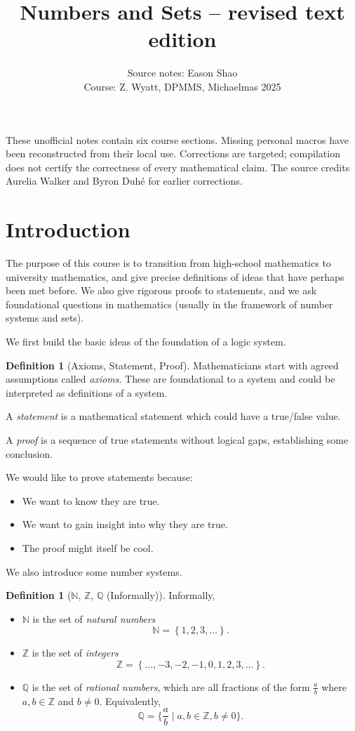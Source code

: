 \documentclass{article}
\title{Numbers and Sets -- revised text edition}
\author{Source notes: Eason Shao\\Course: Z. Wyatt, DPMMS, Michaelmas 2025}
\date{}
\theoremstyle{definition}
\newtheorem{definition}[theorem]{Definition}
\theoremstyle{remark}
\newcommand{\Bqty}[1]{\left\{#1\right\}}
\newcommand{\set}[2]{\{#1\mid #2\}}
\newcommand{\NN}{\mathbb{N}}
\newcommand{\ZZ}{\mathbb{Z}}
\newcommand{\QQ}{\mathbb{Q}}
\begin{document}
\maketitle
These unofficial notes contain six course sections. Missing personal macros have been reconstructed from their local use. Corrections are targeted; compilation does not certify the correctness of every mathematical claim. The source credits Aurelia Walker and Byron Duh\'{e} for earlier corrections.
\tableofcontents
\section{Introduction}
\label{sec:introduction}

The purpose of this course is to transition from high-school mathematics to university mathematics, and give precise definitions of ideas that have perhaps been met before. We also give rigorous proofs to statements, and we ask foundational questions in mathematics (usually in the framework of number systems and sets).


We first build the basic ideas of the foundation of a logic system.

\begin{definition}[Axioms, Statement, Proof]
    Mathematicians start with agreed assumptions called \emph{axioms}. These are foundational to a system and could be interpreted as definitions of a system.

    A \emph{statement} is a mathematical statement which could have a true/false value.

    A \emph{proof} is a sequence of true statements without logical gaps, establishing some conclusion.
\end{definition}

We would like to prove statements because:
\begin{itemize}
    \item We want to know they are true.
    \item We want to gain insight into why they are true.
    \item The proof might itself be cool.
\end{itemize}

We also introduce some number systems.

\begin{definition}[\(\NN\), \(\ZZ\), \(\QQ\) (Informally)]
    Informally,
    \begin{itemize}
        \item \(\NN\) is the set of \emph{natural numbers}
        \[
            \NN = \Bqty{1, 2, 3, \ldots}.
        \]
        \item \(\ZZ\) is the set of \emph{integers}
        \[
            \ZZ = \Bqty{\ldots, -3, -2, -1, 0, 1, 2, 3, \ldots}.
        \]
        \item \(\QQ\) is the set of \emph{rational numbers}, which are all fractions of the form \(\frac{a}{b}\) where \(a, b \in \ZZ\) and \(b \neq 0\). Equivalently,
        \[
            \QQ = \set{\frac{a}{b}}{a, b \in \ZZ, b \neq 0}.
        \]
    \end{itemize}
\end{definition}
\end{document}
